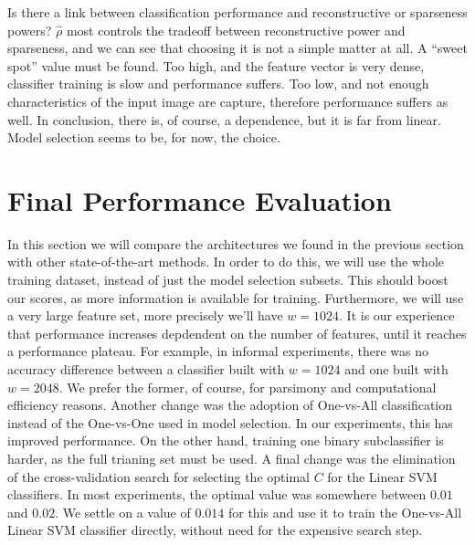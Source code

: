 \documentclass[12pt,a4paper,oneside,english]{UPBThesis}
\begin{document}
Is there a link between classification performance and reconstructive or sparseness powers? $\hat{\rho}$ most controls the tradeoff between reconstructive power and sparseness, and we can see that choosing it is not a simple matter at all. A ``sweet spot'' value must be found. Too high, and the feature vector is very dense, classifier training is slow and performance suffers. Too low, and not enough characteristics of the input image are capture, therefore performance suffers as well. In conclusion, there is, of course, a dependence, but it is far from linear. Model selection seems to be, for now, the choice.

\section{Final Performance Evaluation}
\label{sec:FinalPerformanceEvaluation}

In this section we will compare the architectures we found in the previous section with other state-of-the-art methods. In order to do this, we will use the whole training dataset, instead of just the model selection subsets. This should boost our scores, as more information is available for training. Furthermore, we will use a very large feature set, more precisely we'll have $w = 1024$. It is our experience that performance increases depdendent on the number of features, until it reaches a performance plateau. For example, in informal experiments, there was no accuracy difference between a classifier built with $w = 1024$ and one built with $w = 2048$. We prefer the former, of course, for parsimony and computational efficiency reasons. Another change was the adoption of One-vs-All classification instead of the One-vs-One used in model selection. In our experiments, this has improved performance. On the other hand, training one binary subclassifier is harder, as the full trianing set must be used. A final change was the elimination of the cross-validation search for selecting the optimal $C$ for the Linear SVM classifiers. In most experiments, the optimal value was somewhere between $0.01$ and $0.02$. We settle on a value of $0.014$ for this and use it to train the One-vs-All Linear SVM classifier directly, without need for the expensive search step.
\end{document}
